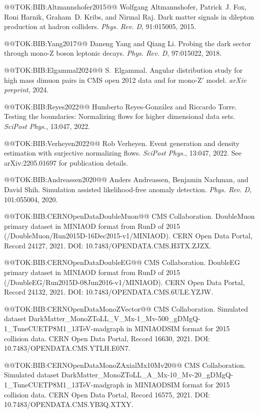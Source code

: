 \documentclass{article}
\begin{document}
@@TOK:BIB:Altmannshofer2015@@ Wolfgang Altmannshofer, Patrick~J. Fox, Roni Harnik, Graham~D. Kribs, and
  Nirmal Raj.
  Dark matter signals in dilepton production at hadron colliders.
  {\em Phys. Rev. D}, 91:015005, 2015.

@@TOK:BIB:Yang2017@@ Daneng Yang and Qiang Li.
  Probing the dark sector through mono-{Z} boson leptonic decays.
  {\em Phys. Rev. D}, 97:015022, 2018.

@@TOK:BIB:Elgammal2024@@ S.~Elgammal.
  Angular distribution study for high mass dimuon pairs in {CMS} open
  2012 data and for mono-{Z}$'$ model.
  {\em arXiv preprint}, 2024.

@@TOK:BIB:Reyes2022@@ Humberto Reyes-Gonz{\'a}lez and Riccardo Torre.
  Testing the boundaries: Normalizing flows for higher dimensional data
  sets.
  {\em SciPost Phys.}, 13:047, 2022.

@@TOK:BIB:Verheyen2022@@ Rob Verheyen.
  Event generation and density estimation with surjective normalizing
  flows.
  {\em SciPost Phys.}, 13:047, 2022.
  See arXiv:2205.01697 for publication details.

@@TOK:BIB:Andreassen2020@@ Anders Andreassen, Benjamin Nachman, and David Shih.
  Simulation assisted likelihood-free anomaly detection.
  {\em Phys. Rev. D}, 101:055004, 2020.

@@TOK:BIB:CERNOpenDataDoubleMuon@@ {CMS Collaboration}.
  {DoubleMuon primary dataset in MINIAOD format from RunD of 2015
  (/DoubleMuon/Run2015D-16Dec2015-v1/MINIAOD)}.
  CERN Open Data Portal, Record 24127, 2021.
  DOI: 10.7483/OPENDATA.CMS.H3TX.ZJZX.

@@TOK:BIB:CERNOpenDataDoubleEG@@ {CMS Collaboration}.
  {DoubleEG primary dataset in MINIAOD format from RunD of 2015
  (/DoubleEG/Run2015D-08Jun2016-v1/MINIAOD)}.
  CERN Open Data Portal, Record 24132, 2021.
  DOI: 10.7483/OPENDATA.CMS.6ULE.YZJW.

@@TOK:BIB:CERNOpenDataMonoZVector@@ {CMS Collaboration}.
  {Simulated dataset
  DarkMatter\_MonoZToLL\_V\_Mx-1\_Mv-500\_gDMgQ-1\_TuneCUETP8M1\_13TeV-madgraph
  in MINIAODSIM format for 2015 collision data}.
  CERN Open Data Portal, Record 16630, 2021.
  DOI: 10.7483/OPENDATA.CMS.YTLH.E0N7.

@@TOK:BIB:CERNOpenDataMonoZAxialMx10Mv20@@ {CMS Collaboration}.
  {Simulated dataset
  DarkMatter\_MonoZToLL\_A\_Mx-10\_Mv-20\_gDMgQ-1\_TuneCUETP8M1\_13TeV-madgraph
  in MINIAODSIM format for 2015 collision data}.
  CERN Open Data Portal, Record 16575, 2021.
  DOI: 10.7483/OPENDATA.CMS.YB3Q.XTXY.
\end{document}
